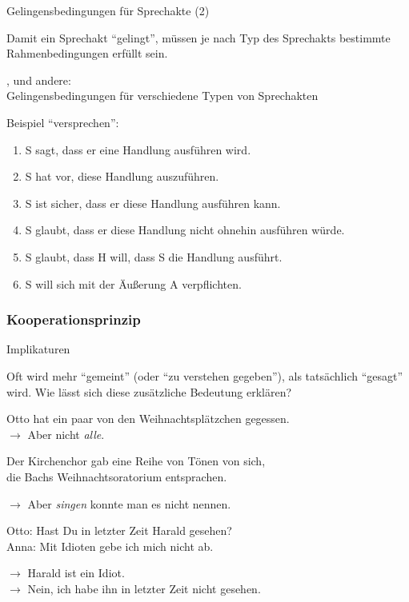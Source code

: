\begin{frame}{Gelingensbedingungen  für Sprechakte (2)}

Damit ein Sprechakt "`gelingt"', müssen je nach Typ des Sprechakts bestimmte Rahmenbedingungen
erfüllt sein. 

\cite{Austin1962}, \cite{Searle1969,Searle1979} und andere:\\
Gelingensbedingungen für verschiedene Typen von Sprechakten

Beispiel "`versprechen"':

\begin{enumerate}[<+->]
\item S sagt, dass er eine Handlung ausführen wird.
\item S hat vor, diese Handlung auszuführen.
\item S ist sicher, dass er diese Handlung ausführen kann.
\item S glaubt, dass er diese Handlung nicht ohnehin ausführen würde.
\item S glaubt, dass H will, dass S die Handlung ausführt.
\item S will sich mit der Äußerung A verpflichten. 
\end{enumerate}
\end{frame}



\subsubsection{Kooperationsprinzip}



\begin{frame}{Implikaturen}

 Oft wird mehr "`gemeint"' (oder "`zu verstehen gegeben"'), als tatsächlich "`gesagt"' wird. Wie lässt sich diese zusätzliche Bedeutung erklären?
  

 \begin{exe}
  \ex Otto hat ein paar von den Weihnachtsplätzchen gegessen.\\

       $\to$ \alert{Aber nicht \textit{alle}.}

\pause

\ex Der Kirchenchor gab eine Reihe von Tönen von sich,\\
    die Bachs Weihnachtsoratorium entsprachen.\pause

$\to$ \alert{Aber \textit{singen} konnte man es nicht nennen.}

\pause
\ex Otto: Hast Du in letzter Zeit Harald gesehen?\\
    Anna: Mit Idioten gebe ich mich nicht ab.\pause


       $\to$ \alert{Harald ist ein Idiot.}\\
       $\to$ \alert{Nein, ich habe ihn in letzter Zeit nicht gesehen.}
 \end{exe}



\end{frame}








